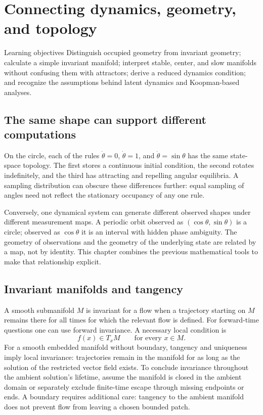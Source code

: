 \chapter{Connecting dynamics, geometry, and topology}\label{ch:05}
\begin{insight}{Learning objectives}
Distinguish occupied geometry from invariant geometry; calculate a simple invariant manifold; interpret stable, center, and slow manifolds without confusing them with attractors; derive a reduced dynamics condition; and recognize the assumptions behind latent dynamics and Koopman-based analyses.
\end{insight}

\section{The same shape can support different computations}
On the circle, each of the rules $\dot\theta=0$, $\dot\theta=1$, and $\dot\theta=\sin\theta$ has the same state-space topology. The first stores a continuous initial condition, the second rotates indefinitely, and the third has attracting and repelling angular equilibria. A sampling distribution can obscure these differences further: equal sampling of angles need not reflect the stationary occupancy of any one rule.

Conversely, one dynamical system can generate different observed shapes under different measurement maps. A periodic orbit observed as $(\cos\theta,\sin\theta)$ is a circle; observed as $\cos\theta$ it is an interval with hidden phase ambiguity. The geometry of observations and the geometry of the underlying state are related by a map, not by identity. This chapter combines the previous mathematical tools to make that relationship explicit.

\section{Invariant manifolds and tangency}
A smooth submanifold $M$ is invariant for a flow when a trajectory starting on $M$ remains there for all times for which the relevant flow is defined. For forward-time questions one can use forward invariance. A necessary local condition is
\begin{equation}\label{eq:tangent-invariance}
f(x)\in T_xM\qquad\text{for every }x\in M.
\end{equation}
For a smooth embedded manifold without boundary, tangency and uniqueness imply local invariance: trajectories remain in the manifold for as long as the solution of the restricted vector field exists. To conclude invariance throughout the ambient solution's lifetime, assume the manifold is closed in the ambient domain or separately exclude finite-time escape through missing endpoints or ends. A boundary requires additional care: tangency to the ambient manifold does not prevent flow from leaving a chosen bounded patch.

